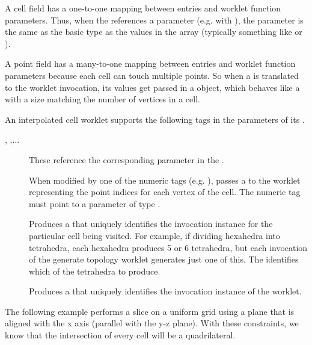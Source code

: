 \begin{description}
  A cell field has a one-to-one mapping between 
  entries and worklet function parameters. Thus, when the
  \executionsignature references a \controlsignature {}
  parameter (e.g. with ), the parameter is the same as the
  basic type as the values in the array (typically something like
   or ).

  A point field has a many-to-one mapping between 
  entries and worklet function parameters because each cell can touch
  multiple points. So when a  is translated to the
  worklet invocation, its values get passed in a 
  object, which behaves like a  with a size matching the number
  of vertices in a cell.
\end{description}

An interpolated cell worklet supports the following tags in the parameters
of its \executionsignature.
\begin{description}
\item[, ,$\ldots$] These reference the
  corresponding parameter in the \controlsignature.
\item[] When modified by one of the numeric tags
  (e.g. ), passes a  to the
  worklet representing the point indices for each vertex of the cell. The
  numeric tag must point to a \controlsignature parameter of type
  .
\item[] Produces a  that uniquely identifies the
  invocation instance for the particular cell being visited. For example,
  if dividing hexahedra into tetrahedra, each hexahedra produces 5 or 6
  tetrahedra, but each invocation of the generate topology worklet
  generates just one of this. The  identifies which of the
  tetrahedra to produce.
\item[] Produces a  that uniquely identifies the
  invocation instance of the worklet.
\end{description}

The following example performs a slice on a uniform grid using a plane that
is aligned with the x axis (parallel with the y-z plane). With these
constraints, we know that the intersection of every cell will be a
quadrilateral.

